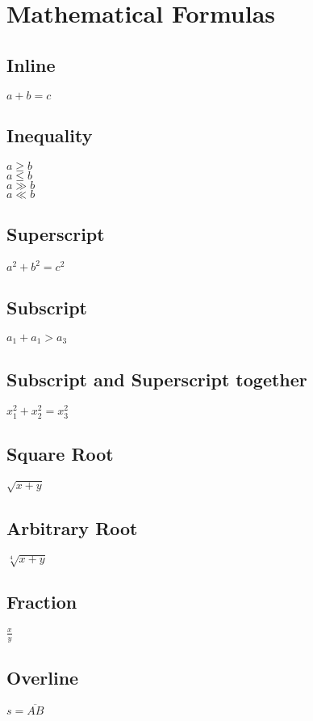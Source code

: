 

\section{Mathematical Formulas}

\subsection{Inline}
$a + b = c$

\subsection{Inequality}
$a \geq b$ \\
$a \leq b$  \\
$a \gg b$   \\
$a \ll b$ 

\subsection{Superscript}
$a^2 + b^2 = c^2$

\subsection{Subscript}
$a_1 + a_1 > a_3$

\subsection{Subscript and Superscript together}
$x_1^2 + x_2^2 = x_3^2$

\subsection{Square Root}
$\sqrt{x + y}$

\subsection{Arbitrary Root}
$\sqrt[4]{x+y}$

\subsection{Fraction}
$\frac{x}{y}$


\subsection{Overline}
$s = \overline{AB}$

